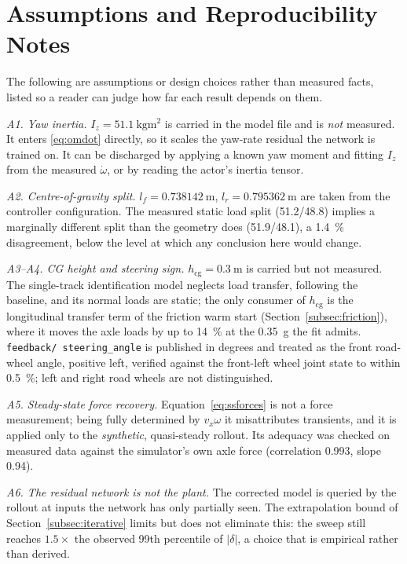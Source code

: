 \section{Assumptions and Reproducibility Notes}
\label{subsec:assumptions}

The following are assumptions or design choices rather than measured facts,
listed so a reader can judge how far each result depends on them.

\emph{A1. Yaw inertia.} $I_{z}=\SI{51.1}{\kilo\gram\meter\squared}$ is carried
in the model file and is \emph{not} measured. It enters \eqref{eq:omdot}
directly, so it scales the yaw-rate residual the network is trained on. It can
be discharged by applying a known yaw moment and fitting $I_{z}$ from the
measured $\dot\omega$, or by reading the actor's inertia tensor.

\emph{A2. Centre-of-gravity split.} $l_{f}=\SI{0.738142}{\meter}$,
$l_{r}=\SI{0.795362}{\meter}$ are taken from the controller configuration. The
measured static load split (51.2/48.8) implies a marginally different split than
the geometry does (51.9/48.1), a \SI{1.4}{\percent} disagreement, below the
level at which any conclusion here would change.

\emph{A3--A4. CG height and steering sign.} $h_{\mathrm{cg}}=\SI{0.3}{\meter}$
is carried but not measured. The single-track identification model neglects
load transfer, following the baseline, and its normal loads are static; the
only consumer of $h_{\mathrm{cg}}$ is the longitudinal transfer term of the
friction warm start (Section~\ref{subsec:friction}), where it moves the axle
loads by up to \SI{14}{\percent} at the \SI{0.35}{\g} the fit admits. \texttt{feedback/\allowbreak
steering\_angle} is published in degrees and treated as the front road-wheel
angle, positive left, verified against the front-left wheel joint state to
within \SI{0.5}{\percent}; left and right road wheels are not distinguished.

\emph{A5. Steady-state force recovery.} Equation~\eqref{eq:ssforces} is not a
force measurement; being fully determined by $v_{x}\omega$ it misattributes
transients, and it is applied only to the \emph{synthetic}, quasi-steady
rollout. Its adequacy was checked on measured data against the simulator's own
axle force (correlation \num{0.993}, slope \num{0.94}).

\emph{A6. The residual network is not the plant.} The corrected model is queried
by the rollout at inputs the network has only partially seen. The extrapolation
bound of Section~\ref{subsec:iterative} limits but does not eliminate this: the
sweep still reaches $1.5\times$ the observed 99th percentile of $|\delta|$, a
choice that is empirical rather than derived.

